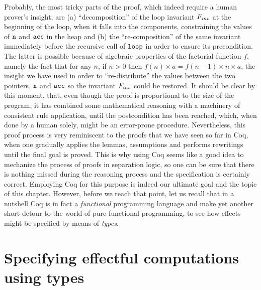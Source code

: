 Probably, the most tricky parts of the proof, which indeed require a
human prover's insight, are (a) ``decomposition'' of the loop invariant
$F_{\mathit{inv}}$ at the beginning of the loop, when it falls into the
components, constraining the values of $\mathtt{n}$ and $\mathtt{acc}$ in
the heap and (b) the ``re-composition'' of the same invariant
immediately before the recursive call of $\mathtt{loop}$ in order to
ensure its precondition. The latter is possible because of algebraic
properties of the factorial function $f$, namely the fact that for any
$n$, if $n > 0$ then $f(n)\times a = f(n-1) \times n \times a$, the
insight we have used in order to ``re-distribute'' the values between
the two pointers, $\mathtt{n}$ and $\mathtt{acc}$ so the invariant $F_{\mathit{inv}}$
could be restored.
It should be clear by this moment, that, even though the proof is
proportional to the size of the program, it has combined some
mathematical reasoning with a machinery of consistent rule
application, until the postcondition has been reached, which, when
done by a human solely, might be an error-prone
procedure. Nevertheless, this proof process is very reminiscent to the
proofs that we have seen so far in Coq, when one gradually applies the
lemmas, assumptions and performs rewritings until the final goal is
proved. This is why using Coq seems like a good idea to mechanize the
process of proofs in separation logic, so one can be sure that there
is nothing missed during the reasoning process and the specification
is certainly correct. Employing Coq for this purpose is indeed our
ultimate goal and the topic of this chapter. However, before we reach
that point, let us recall that in a nutshell Coq is in fact a
\textit{functional} programming language and make yet another short detour to
the world of pure functional programming, to see how effects might be
specified by means of \textit{types}.
\section{Specifying effectful computations using types}


